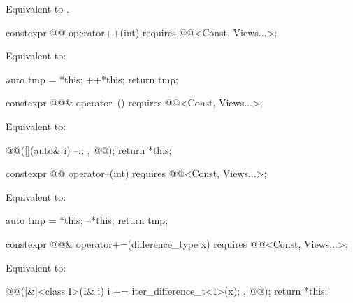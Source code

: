 \begin{itemdescr}
\pnum
\effects
Equivalent to .
\end{itemdescr}

%
\begin{itemdecl}
constexpr @@ operator++(int) requires @@<Const, Views...>;
\end{itemdecl}

\begin{itemdescr}
\pnum
\effects
Equivalent to:
\begin{codeblock}
auto tmp = *this;
++*this;
return tmp;
\end{codeblock}
\end{itemdescr}

%
\begin{itemdecl}
constexpr @@& operator--() requires @@<Const, Views...>;
\end{itemdecl}

\begin{itemdescr}
\pnum
\effects
Equivalent to:
\begin{codeblock}
@@([](auto& i) { --i; }, @@);
return *this;
\end{codeblock}
\end{itemdescr}

%
\begin{itemdecl}
constexpr @@ operator--(int) requires @@<Const, Views...>;
\end{itemdecl}

\begin{itemdescr}
\pnum
\effects
Equivalent to:
\begin{codeblock}
auto tmp = *this;
--*this;
return tmp;
\end{codeblock}
\end{itemdescr}

%
\begin{itemdecl}
constexpr @@& operator+=(difference_type x)
  requires @@<Const, Views...>;
\end{itemdecl}

\begin{itemdescr}
\pnum
\effects
Equivalent to:
\begin{codeblock}
@@([&]<class I>(I& i) { i += iter_difference_t<I>(x); }, @@);
return *this;
\end{codeblock}
\end{itemdescr}

